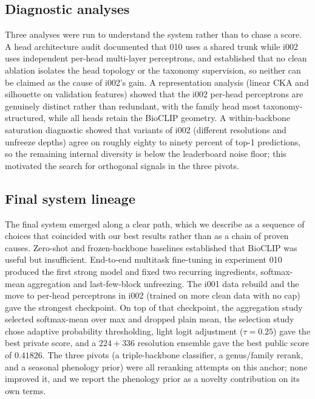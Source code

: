 \subsection{Diagnostic analyses}
Three analyses were run to understand the system rather than to chase a score. A head
architecture audit documented that 010 uses a shared trunk while i002 uses independent
per-head multi-layer perceptrons, and established that no clean ablation isolates the
head topology or the taxonomy supervision, so neither can be claimed as the cause of
i002's gain. A representation analysis (linear CKA and silhouette on validation
features) showed that the i002 per-head perceptrons are genuinely distinct rather than
redundant, with the family head most taxonomy-structured, while all heads retain the
BioCLIP geometry. A within-backbone saturation diagnostic showed that variants of i002
(different resolutions and unfreeze depths) agree on roughly eighty to ninety percent
of top-1 predictions, so the remaining internal diversity is below the leaderboard
noise floor; this motivated the search for orthogonal signals in the three pivots.

\subsection{Final system lineage}
The final system emerged along a clear path, which we describe as a sequence of choices
that coincided with our best results rather than as a chain of proven causes. Zero-shot
and frozen-backbone baselines established that BioCLIP was useful but insufficient.
End-to-end multitask fine-tuning in experiment 010 produced the first strong model and
fixed two recurring ingredients, softmax-mean aggregation and last-few-block
unfreezing. The i001 data rebuild and the move to per-head perceptrons in i002 (trained
on more clean data with no cap) gave the strongest checkpoint. On top of that
checkpoint, the aggregation study selected softmax-mean over max and dropped plain mean,
the selection study chose adaptive probability thresholding, light logit adjustment
($\tau{=}0.25$) gave the best private score, and a $224{+}336$ resolution ensemble gave
the best public score of $0.41826$. The three pivots (a triple-backbone classifier, a
genus/family rerank, and a seasonal phenology prior) were all reranking attempts on this
anchor; none improved it, and we report the phenology prior as a novelty contribution
on its own terms.

